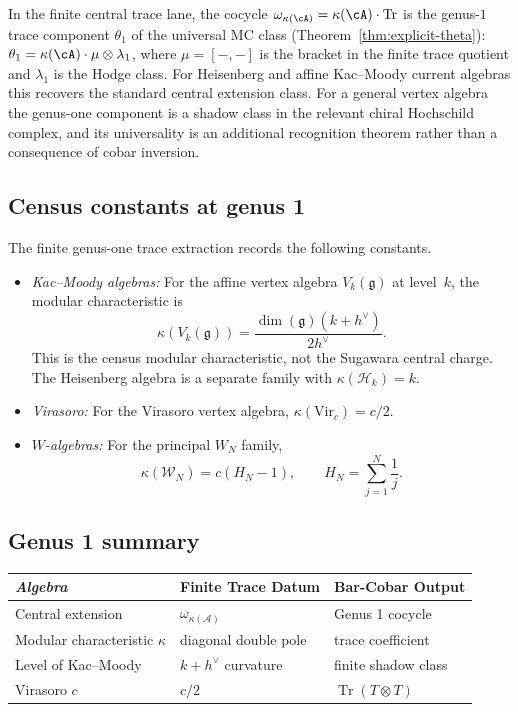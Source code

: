 \begin{remark}
\label{rem:central-ext-theta1}
In the finite central trace lane, the cocycle
$\omega_{\kappa(\cA)} = \kappa(\cA) \cdot \mathrm{Tr}$ is the genus-$1$ trace
component $\theta_1$ of the universal MC class
(Theorem~\ref{thm:explicit-theta}):
$\theta_1 = \kappa(\cA) \cdot \mu \otimes \lambda_1$,
where $\mu = [-,-]$ is the bracket in the finite trace quotient and
$\lambda_1$ is the Hodge class. For Heisenberg and affine
Kac--Moody current algebras this recovers the standard central
extension class. For a general vertex algebra the genus-one component is
a shadow class in the relevant chiral Hochschild complex, and its
universality is an additional recognition theorem rather than a
consequence of cobar inversion.
\end{remark}

\subsection{Census constants at genus 1}

The finite genus-one trace extraction records the following constants.

\begin{itemize}
\item \emph{Kac--Moody algebras:} For the affine vertex algebra
$V_k(\mathfrak{g})$ at level~$k$, the modular characteristic is
\[
\kappa(V_k(\mathfrak{g}))
=\frac{\dim(\mathfrak{g})(k+h^\vee)}{2h^\vee}.
\]
This is the census modular characteristic, not the Sugawara central
charge. The Heisenberg algebra is a separate family with
$\kappa(\mathcal{H}_k)=k$.

\item \emph{Virasoro:} For the Virasoro vertex algebra,
$\kappa(\mathrm{Vir}_c)=c/2$.

\item \emph{$W$-algebras:} For the principal $W_N$ family,
\[
\kappa(\mathcal W_N)=c(H_N-1),
\qquad H_N=\sum_{j=1}^N\frac1j.
\]
\end{itemize}

\subsection{Genus 1 summary}

\begin{center}
\begin{tabular}{|l|l|l|}
\hline
\emph{Algebra} & \textbf{Finite Trace Datum} & \textbf{Bar-Cobar Output} \\
\hline
Central extension & $\omega_{\kappa(\mathcal A)}$ & Genus 1 cocycle \\
Modular characteristic $\kappa$ & diagonal double pole & trace coefficient \\
Level of Kac--Moody & $k+h^\vee$ curvature & finite shadow class \\
Virasoro $c$ & $c/2$ & $\operatorname{Tr}(T \otimes T)$ \\
\hline
\end{tabular}
\end{center}

